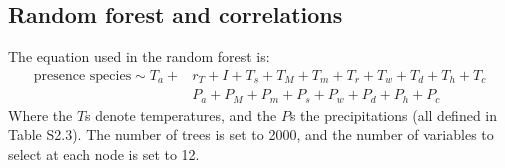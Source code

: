 \documentclass[letterpaper, 12pt]{article}
\theoremstyle{theo}
\begin{document}
\tableofcontents
\listoftables
\listoffigures
\newpage

\begin{refsection}
\begin{onehalfspace}

\section{Random forest and correlations} \label{app::randomForest}
The equation used in the random forest is:
\begin{equation}
	\begin{split}
	\text{presence species} \sim T_a +{} & r_T + I + T_s + T_M + T_m + T_r + T_w + T_d + T_h + T_c \\
		& P_a + P_M + P_m + P_s + P_w + P_d + P_h + P_c
	\end{split}
\end{equation}
Where the $ T $s denote temperatures, and the $ P $s the precipitations (all defined in Table S2.3). The number of trees is set to 2000, and the number of variables to select at each node is set to 12.


\end{onehalfspace}
\end{refsection}
\end{document}

